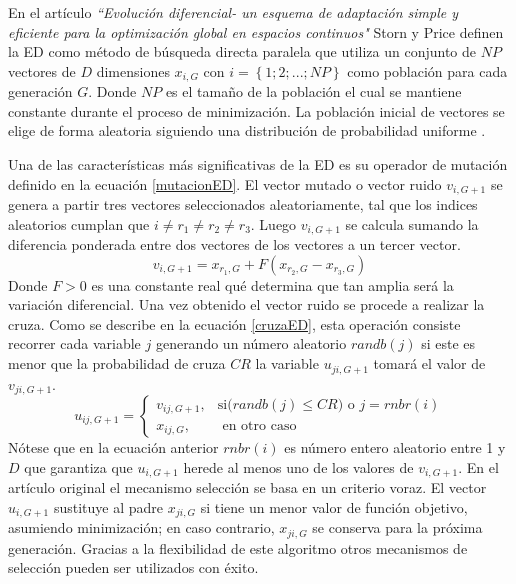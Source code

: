 En el artículo \textit{``Evolución diferencial- un esquema de adaptación simple y eficiente para la optimización global en espacios continuos"} Storn y Price definen la ED como método de búsqueda directa paralela que utiliza un conjunto de $NP$ vectores  de $D$ dimensiones $x_{i,G}$ con $i =\left\lbrace 1; 2; ...; NP\right\rbrace $  como población para cada generación $G$. Donde $NP$ es el tamaño de la población el cual se mantiene constante durante el proceso de minimización. La población inicial de vectores se elige de forma aleatoria siguiendo una distribución de probabilidad uniforme \cite{storn_differential_1997}.

Una de las características más significativas de la ED es su operador de mutación definido en la ecuación \ref{mutacionED}. El vector mutado o vector ruido $v_{i,G+1}$ se genera a partir tres vectores seleccionados aleatoriamente, tal que los indices aleatorios cumplan que $ i \neq r_1 \neq r_2 \neq r_3$. Luego $v_{i,G+1}$ se calcula sumando la diferencia ponderada entre dos vectores de los vectores a un tercer vector.
\begin{equation} \label{mutacionED}
v_{i,G+1} = x_{r_1,G} + F (x_{r_2 ,G}-x_{r_3,G})
\end{equation}
Donde $F >0$ es una constante real qué determina que tan amplia será la variación diferencial. Una vez obtenido el vector ruido se procede a realizar la cruza. Como se describe en la ecuación \ref{cruzaED}, esta operación consiste recorrer cada variable $j$  generando un número aleatorio $randb(j)$  si este es menor que la probabilidad de cruza $CR$ la variable $u_{ji,G+1}$ tomará el valor de  $v_{ji,G+1}$. 
\begin{equation} \label{cruzaED}
  u_{ij,G+1} = 
\begin{cases}
    v_{ij,G+1},& \text{si($randb(j) \leq CR$) o $j=rnbr(i)$}\\
    x_{ij,G},& \text{ en otro caso}
\end{cases}
\end{equation}
Nótese que en la ecuación anterior $rnbr(i)$ es número entero aleatorio entre 1 y $D$ que garantiza que  $u_{i,G+1}$ herede al menos uno de los valores de $v_{i,G+1}$. En el artículo original el mecanismo selección se basa en un criterio voraz. El vector $u_{i,G+1}$ sustituye al padre  $x_{ji,G}$ si tiene un menor valor de función objetivo, asumiendo minimización; en caso contrario, $x_{ji,G}$ se conserva para la próxima generación. Gracias a la flexibilidad de este algoritmo otros mecanismos de selección pueden ser utilizados con éxito. 

